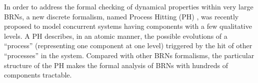


In order to address the formal checking of dynamical properties within very large BRNs, a new discrete formalism, named Process Hitting (PH) \cite{PMR10-TCSB}, was recently proposed to model concurrent systems having components with a few qualitative levels. A PH describes, in an atomic manner, the possible evolutions of a ``process'' (representing one component at one level) triggered by the hit of other ``processes'' in the system. Compared with other BRNs formalisms, the particular structure of the PH makes the formal analysis of BRNs with hundreds of components tractable. 

